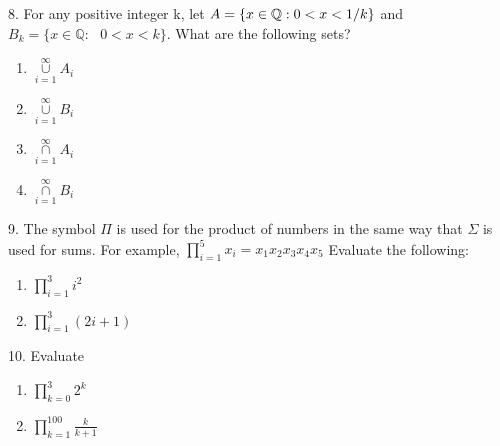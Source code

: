 \documentclass[10pt,]{book}
\theoremstyle{plain}
\theoremstyle{definition}
\begin{document}
\begin{exercisegroup}
\par\smallskip
\item[8.]\hypertarget{exercise-39}{} 
 For any positive integer k, let \(A = \{x \in \mathbb{Q}:\text0 < x < 1/k\}\) and \(B _k = \{x \in \mathbb{Q}:\text{   }0 < x < k\}\). What
are the following sets? 
\leavevmode%
\begin{enumerate}[label=(\alph*)]
\item\hypertarget{li-194}{}  \(\underset{i=1}{\overset{\infty }{\cup }}A_i\)\item\hypertarget{li-195}{}  \(\underset{i=1}{\overset{\infty }{\cup }}B_i\)\item\hypertarget{li-196}{}  \(\underset{i=1}{\overset{\infty }{\cap }}A_i\)\item\hypertarget{li-197}{}  \(\underset{i=1}{\overset{\infty }{\cap }}B_i\)\end{enumerate}
\par\smallskip
\item[9.]\hypertarget{exercise-40}{} 
The symbol \(\Pi\) is used for the product of numbers in the same way that \(\Sigma\) is used for sums. For example,
  \(\prod _{i=1}^5 x_i=x_1 x_2 x_3 x_4 x_5\)
Evaluate the following: 
\leavevmode%
\begin{enumerate}[label=(\alph*)]
\item\hypertarget{li-198}{}  \(\prod _{i=1}^3 i^2\)\item\hypertarget{li-199}{}   \(\prod _{i=1}^3 (2i+1)\)\end{enumerate}
\par\smallskip
\item[10.]\hypertarget{exercise-41}{} 
Evaluate
\leavevmode%
\begin{enumerate}[label=(\alph*)]
\item\hypertarget{li-200}{}   \(\prod _{k=0}^3 2^k\)\item\hypertarget{li-201}{}   \(\prod _{k=1}^{100} \frac{k}{k+1}\)\end{enumerate}
\par\smallskip
\end{exercisegroup}
\par\smallskip\noindent
\typeout{************************************************}
\typeout{************************************************}
\end{document}
